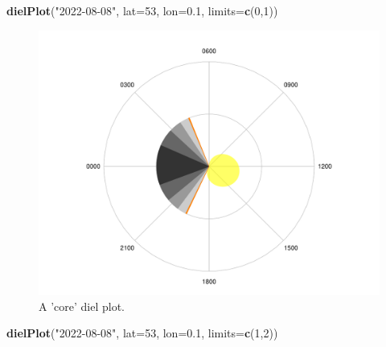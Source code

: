 \documentclass[
]{book}
\newenvironment{Shaded}{\begin{snugshade}}{\end{snugshade}}
\newcommand{\AttributeTok}[1]{\textcolor[rgb]{0.13,0.29,0.53}{#1}}
\newcommand{\DecValTok}[1]{\textcolor[rgb]{0.00,0.00,0.81}{#1}}
\newcommand{\FloatTok}[1]{\textcolor[rgb]{0.00,0.00,0.81}{#1}}
\newcommand{\FunctionTok}[1]{\textcolor[rgb]{0.13,0.29,0.53}{\textbf{#1}}}
\newcommand{\NormalTok}[1]{#1}
\newcommand{\StringTok}[1]{\textcolor[rgb]{0.31,0.60,0.02}{#1}}
\begin{document}
\begin{Shaded}
\begin{Highlighting}[]
\FunctionTok{dielPlot}\NormalTok{(}\StringTok{"2022{-}08{-}08"}\NormalTok{, }\AttributeTok{lat=}\DecValTok{53}\NormalTok{, }\AttributeTok{lon=}\FloatTok{0.1}\NormalTok{, }\AttributeTok{limits=}\FunctionTok{c}\NormalTok{(}\DecValTok{0}\NormalTok{,}\DecValTok{1}\NormalTok{))}
\end{Highlighting}
\end{Shaded}

\begin{figure}

{\centering \includegraphics[width=0.9\linewidth]{_main_files/figure-latex/diel-plot-core-1} 

}

\caption{A 'core' diel plot.}\label{fig:diel-plot-core}
\end{figure}

\begin{Shaded}
\begin{Highlighting}[]
\FunctionTok{dielPlot}\NormalTok{(}\StringTok{"2022{-}08{-}08"}\NormalTok{, }\AttributeTok{lat=}\DecValTok{53}\NormalTok{, }\AttributeTok{lon=}\FloatTok{0.1}\NormalTok{, }\AttributeTok{limits=}\FunctionTok{c}\NormalTok{(}\DecValTok{1}\NormalTok{,}\DecValTok{2}\NormalTok{))}
\end{Highlighting}
\end{Shaded}
\end{document}

